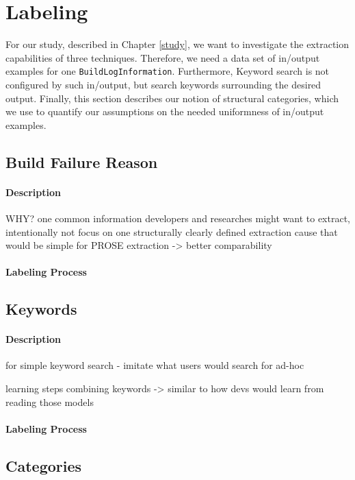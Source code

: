 \documentclass[\myrootdir/main.tex]{subfiles}
\begin{document}
\section{Labeling}
For our study, described in Chapter \ref{study}, we want to investigate the extraction capabilities of three techniques. Therefore, we need a data set of in/output examples for one \texttt{BuildLogInformation}. Furthermore, Keyword search is not configured by such in/output, but search keywords surrounding the desired output. Finally, this section describes our notion of structural categories, which we use to quantify our assumptions on the needed uniformness of in/output examples.

  \subsection{Build Failure Reason}

    \paragraph{Description}
    WHY? one common information developers and researches might want to extract, intentionally not focus on one structurally clearly defined extraction   cause that would be simple for PROSE extraction -> better comparability
    \paragraph{Labeling Process}

  \subsection{Keywords}

    \paragraph{Description}
    for simple keyword search - imitate what users would search for ad-hoc

    learning steps combining keywords -> similar to how devs would learn from reading those models

    \paragraph{Labeling Process}

  \subsection{Categories}
\end{document}
